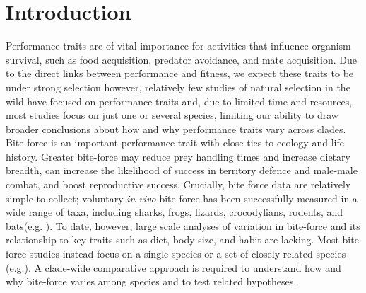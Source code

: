 \documentclass[a4paper, 12pt]{article}
\begin{document}
\section{Introduction}\label{main}

Performance traits are of vital importance for activities that influence organism survival, such as food acquisition, predator avoidance, and mate acquisition\cite{lailvaux2004performance,legalliard2004,lappin2005weapon,irschick2008}. 
Due to the direct links between performance and fitness, we expect these traits to be under strong selection\cite{arnold1983,irschick2008} however, relatively few studies of natural selection in the wild have focused on performance traits\cite{irschick2008,kingsolver2012} and, due to limited time and resources, most studies focus on just one or several species, limiting our ability to draw broader conclusions about how and why performance traits vary across clades\cite{irschick2008}. 
Bite-force is an important performance trait with close ties to ecology and life history\cite{herrel1999morphology,anderson2008bite,erickson2014comparative,lappin2014reliable,husak2009fitness}. 
Greater bite-force may reduce prey handling times and increase dietary breadth\cite{herrel1999morphology,herrel2004omnivory,verwaijen2002relationships,van2006seed,taverne2020proximate}, can increase the likelihood of success in territory defence and male-male combat\cite{lailvaux2004performance,lappin2005weapon,huyghe2005morphology,husak2006bite}, and boost reproductive success\cite{lappin2005weapon,husak2006bite,husak2009fitness}.
Crucially, bite force data are relatively simple to collect; voluntary \textit{in vivo} bite-force has been successfully measured in a wide range of taxa, including sharks, frogs, lizards, crocodylians, rodents, and bats(e.g. \cite{herrel1999morphology,huber2005analysis,santana2010mechanics,becerra2013biting,erickson2014comparative,lappin2014reliable,lappin2017bite}). 
To date, however, large scale analyses of variation in bite-force and its relationship to key traits such as diet, body size, and habit are lacking. Most bite force studies instead focus on a single species or a set of closely related species (e.g.\cite{taverne2020proximate}).
A clade-wide comparative approach is required to understand how and why bite-force varies among species and to test related hypotheses.
\end{document}
